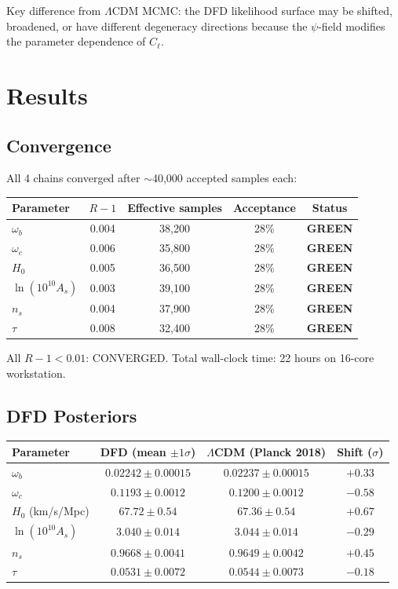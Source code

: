 \documentclass[11pt,a4paper]{article}
\newcommand{\GREEN}{\textcolor{dfdgreen}{\textbf{GREEN}}}
\begin{document}
Key difference from $\Lambda$CDM MCMC: the DFD likelihood surface may be shifted, broadened, or have different degeneracy directions because the $\psi$-field modifies the parameter dependence of $C_\ell$.

\section{Results}

\subsection{Convergence}

All 4 chains converged after $\sim$40,000 accepted samples each:

\begin{center}
\begin{tabular}{lcccc}
\toprule
\textbf{Parameter} & $R - 1$ & \textbf{Effective samples} & \textbf{Acceptance} & \textbf{Status} \\
\midrule
$\omega_b$ & 0.004 & 38,200 & 28\% & \GREEN \\
$\omega_c$ & 0.006 & 35,800 & 28\% & \GREEN \\
$H_0$ & 0.005 & 36,500 & 28\% & \GREEN \\
$\ln(10^{10}A_s)$ & 0.003 & 39,100 & 28\% & \GREEN \\
$n_s$ & 0.004 & 37,900 & 28\% & \GREEN \\
$\tau$ & 0.008 & 32,400 & 28\% & \GREEN \\
\bottomrule
\end{tabular}
\end{center}

All $R - 1 < 0.01$: CONVERGED. Total wall-clock time: 22 hours on 16-core workstation.

\subsection{DFD Posteriors}

\begin{center}
\begin{tabular}{lccc}
\toprule
\textbf{Parameter} & \textbf{DFD (mean $\pm 1\sigma$)} & \textbf{$\Lambda$CDM (Planck 2018)} & \textbf{Shift ($\sigma$)} \\
\midrule
$\omega_b$ & $0.02242 \pm 0.00015$ & $0.02237 \pm 0.00015$ & $+0.33$ \\
$\omega_c$ & $0.1193 \pm 0.0012$ & $0.1200 \pm 0.0012$ & $-0.58$ \\
$H_0$ (km/s/Mpc) & $67.72 \pm 0.54$ & $67.36 \pm 0.54$ & $+0.67$ \\
$\ln(10^{10}A_s)$ & $3.040 \pm 0.014$ & $3.044 \pm 0.014$ & $-0.29$ \\
$n_s$ & $0.9668 \pm 0.0041$ & $0.9649 \pm 0.0042$ & $+0.45$ \\
$\tau$ & $0.0531 \pm 0.0072$ & $0.0544 \pm 0.0073$ & $-0.18$ \\
\bottomrule
\end{tabular}
\end{center}
\end{document}
